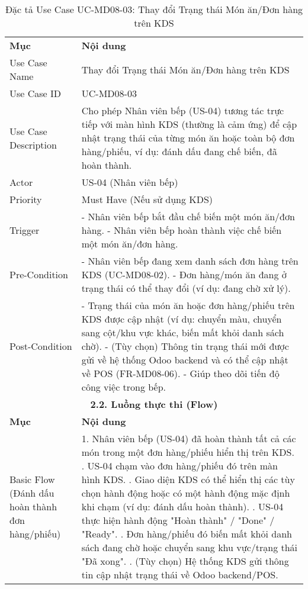 \begin{longtable}{|m{4cm}|p{11cm}|}
\caption{Đặc tả Use Case UC-MD08-03: Thay đổi Trạng thái Món ăn/Đơn hàng trên KDS} \label{tab:uc_md08_03} \\
\hline

\endhead %
\hline
\endfoot %
\hline
\endlastfoot %
\multicolumn{2}{|c|}{\textbf{2.1. Tóm tắt (Summary)}} \\
\hline
\textbf{Mục} & \textbf{Nội dung} \\
\hline
Use Case Name & Thay đổi Trạng thái Món ăn/Đơn hàng trên KDS \\
\hline
Use Case ID & UC-MD08-03 \\
\hline
Use Case Description & Cho phép Nhân viên bếp (US-04) tương tác trực tiếp với màn hình KDS (thường là cảm ứng) để cập nhật trạng thái của từng món ăn hoặc toàn bộ đơn hàng/phiếu, ví dụ: đánh dấu đang chế biến, đã hoàn thành. \\
\hline
Actor & US-04 (Nhân viên bếp) \\
\hline
Priority & Must Have (Nếu sử dụng KDS) \\
\hline
Trigger & - Nhân viên bếp bắt đầu chế biến một món ăn/đơn hàng. \newline - Nhân viên bếp hoàn thành việc chế biến một món ăn/đơn hàng. \\
\hline
Pre-Condition & - Nhân viên bếp đang xem danh sách đơn hàng trên KDS (UC-MD08-02). \newline - Đơn hàng/món ăn đang ở trạng thái có thể thay đổi (ví dụ: đang chờ xử lý). \\
\hline
Post-Condition & - Trạng thái của món ăn hoặc đơn hàng/phiếu trên KDS được cập nhật (ví dụ: chuyển màu, chuyển sang cột/khu vực khác, biến mất khỏi danh sách chờ). \newline - (Tùy chọn) Thông tin trạng thái mới được gửi về hệ thống Odoo backend và có thể cập nhật về POS (FR-MD08-06). \newline - Giúp theo dõi tiến độ công việc trong bếp. \\
\hline
\multicolumn{2}{|c|}{\textbf{2.2. Luồng thực thi (Flow)}} \\
\hline
\textbf{Mục} & \textbf{Nội dung} \\
\hline
Basic Flow (Đánh dấu hoàn thành đơn hàng/phiếu) & 1. Nhân viên bếp (US-04) đã hoàn thành tất cả các món trong một đơn hàng/phiếu hiển thị trên KDS. \newline 2. US-04 chạm vào đơn hàng/phiếu đó trên màn hình KDS. \newline 3. Giao diện KDS có thể hiển thị các tùy chọn hành động hoặc có một hành động mặc định khi chạm (ví dụ: đánh dấu hoàn thành). \newline 4. US-04 thực hiện hành động "Hoàn thành" / "Done" / "Ready". \newline 5. Đơn hàng/phiếu đó biến mất khỏi danh sách đang chờ hoặc chuyển sang khu vực/trạng thái "Đã xong". \newline 6. (Tùy chọn) Hệ thống KDS gửi thông tin cập nhật trạng thái về Odoo backend/POS. \\

\end{longtable}
